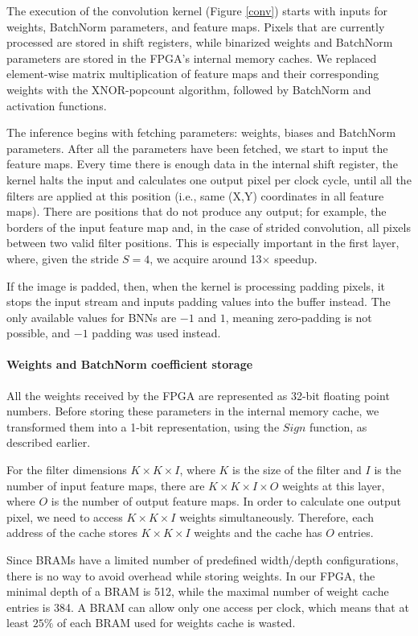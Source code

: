 \documentclass[conference]{IEEEtran}
\begin{document}
	The execution of the convolution kernel (Figure \ref{conv})  starts with inputs for weights, BatchNorm parameters, and feature maps. Pixels that are currently processed are stored in shift registers, while binarized weights and BatchNorm parameters are stored in the FPGA's internal memory caches. We replaced element-wise matrix multiplication of feature maps and their corresponding weights with the XNOR-popcount algorithm, followed by BatchNorm and activation functions.
	
	The inference begins with fetching parameters: weights, biases and BatchNorm parameters. After all the parameters have been fetched, we start to input the feature maps. Every time there is enough data in the internal shift register, the kernel halts the input and calculates one output pixel per clock cycle, until all the filters are applied at this position (i.e., same (X,Y) coordinates in all feature maps). 
	There are positions that do not produce any output; for example, the borders of the input feature map and, in the case of strided convolution, all pixels between two valid filter positions. This is especially important in the first layer, where, given the stride $S=4$, we acquire around 13$\times$ speedup.
	
	If the image is padded, then, when the kernel is processing padding pixels, it stops the input stream and inputs padding values into the buffer instead. The only available values for BNNs are $-1$ and $1$, meaning zero-padding is not possible, and $-1$ padding was used instead.
	\paragraph{Weights and BatchNorm coefficient storage}
	All the weights received by the FPGA are represented as 32-bit floating point numbers. Before storing these parameters in the internal memory cache, we transformed them into a 1-bit representation, using the $Sign$ function, as described earlier.
	
	For the filter dimensions $K\times K\times I$, where $K$ is the size of the filter and $I$ is the number of input feature maps, there are $K\times K\times I \times O$ weights at this layer, where $O$ is the number of output feature maps. In order to calculate one output pixel, we need to access $K\times K\times I$ weights simultaneously. Therefore, each address of the cache stores $K\times K\times I$ weights and the cache has $O$ entries.
	
	Since BRAMs have a limited number of predefined width/depth configurations, there is no way to avoid overhead while storing weights. In our FPGA, the minimal depth of a BRAM is 512, while the maximal number of weight cache entries is 384. A BRAM can allow only one access per clock, which means that at least $25\%$ of each BRAM used for weights cache is wasted.
	
\end{document}
